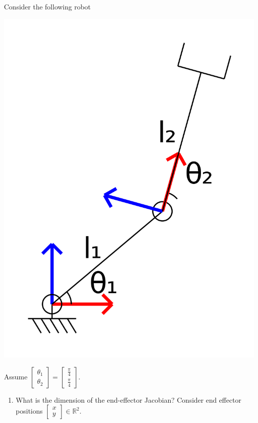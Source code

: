 \documentclass{16384_doc} %
\begin{document}
\begin{questions}
    Consider the following robot
    \begin{center}
    \includegraphics[scale=0.07]{generated_figures/RR_nonsingular.png}
    \end{center}
        Assume $\begin{bmatrix}
            \theta_1 \\
            \theta_2
        \end{bmatrix} = \begin{bmatrix}
            \frac\pi4 \\
            \frac\pi4
        \end{bmatrix}$.
    \begin{enumerate} [label=\alph*.]
        \item \text{[1 point]} What is the dimension of the end-effector Jacobian? Consider
        end effector positions $\begin{bmatrix} x \\ y \end{bmatrix} \in \mathbb{R}^2$.%
        \begin{tcolorbox}[height=3cm]
        \end{tcolorbox}
        

\end{enumerate}
\end{questions}
\end{document}
